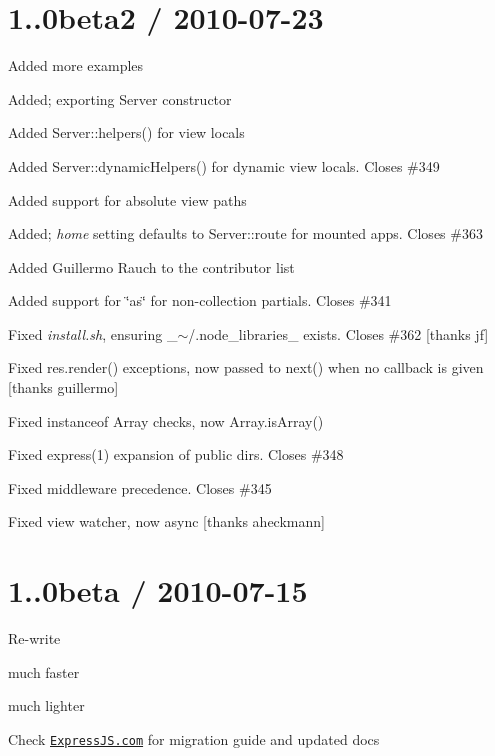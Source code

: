 {\ttfamily \section*{1..\+0beta2 / 2010-\/07-\/23 }}

{\ttfamily }

{\ttfamily 
\begin{DoxyItemize}
\item Added more examples
\item Added; exporting {\ttfamily Server} constructor
\item Added {\ttfamily Server\+::helpers()} for view locals
\item Added {\ttfamily Server\+::dynamic\+Helpers()} for dynamic view locals. Closes \#349
\item Added support for absolute view paths
\item Added; {\itshape home} setting defaults to {\ttfamily Server\+::route} for mounted apps. Closes \#363
\item Added Guillermo Rauch to the contributor list
\item Added support for \char`\"{}as\char`\"{} for non-\/collection partials. Closes \#341
\item Fixed {\itshape install.\+sh}, ensuring \+\_\+$\sim$/.node\+\_\+libraries\+\_\+ exists. Closes \#362 \mbox{[}thanks jf\mbox{]}
\item Fixed {\ttfamily res.\+render()} exceptions, now passed to {\ttfamily next()} when no callback is given \mbox{[}thanks guillermo\mbox{]}
\item Fixed instanceof {\ttfamily Array} checks, now {\ttfamily Array.\+is\+Array()}
\item Fixed express(1) expansion of public dirs. Closes \#348
\item Fixed middleware precedence. Closes \#345
\item Fixed view watcher, now async \mbox{[}thanks aheckmann\mbox{]}
\end{DoxyItemize}}

{\ttfamily \section*{1..\+0beta / 2010-\/07-\/15 }}

{\ttfamily }

{\ttfamily 
\begin{DoxyItemize}
\item Re-\/write
\begin{DoxyItemize}
\item much faster
\item much lighter
\item Check \href{http://expressjs.com}{\tt Express\+J\+S.\+com} for migration guide and updated docs
\end{DoxyItemize}
\end{DoxyItemize}}

